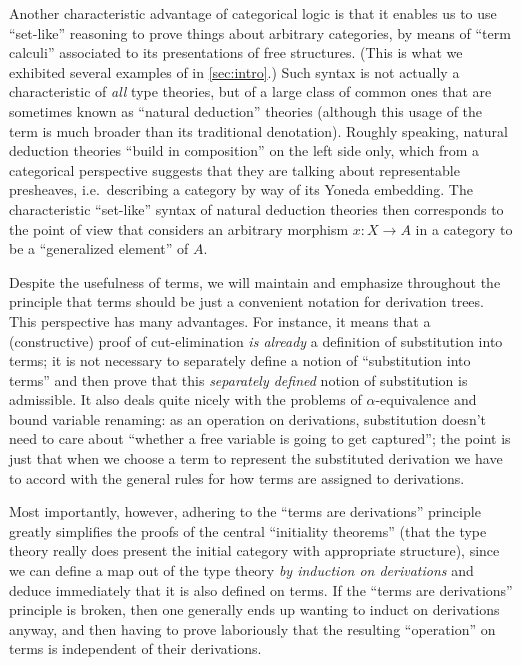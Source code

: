 Another characteristic advantage of categorical logic is that it enables us to use ``set-like'' reasoning to prove things about arbitrary categories, by means of ``term calculi'' associated to its presentations of free structures.
(This is what we exhibited several examples of in \cref{sec:intro}.)
Such syntax is not actually a characteristic of \emph{all} type theories, but of a large class of common ones that are sometimes known as ``natural deduction'' theories (although this usage of the term is much broader than its traditional denotation).
Roughly speaking, natural deduction theories ``build in composition'' on the left side only, which from a categorical perspective suggests that they are talking about representable presheaves, i.e.\ describing a category by way of its Yoneda embedding.
The characteristic ``set-like'' syntax of natural deduction theories then corresponds to the point of view that considers an arbitrary morphism $x:X\to A$ in a category to be a ``generalized element'' of $A$.

Despite the usefulness of terms, we will maintain and emphasize throughout the principle that terms should be just a convenient notation for derivation trees.
This perspective has many advantages.
For instance, it means that a (constructive) proof of cut-elimination \emph{is already} a definition of substitution into terms; it is not necessary to separately define a notion of ``substitution into terms'' and then prove that this \emph{separately defined} notion of substitution is admissible.
It also deals quite nicely with the problems of $\alpha$-equivalence and bound variable renaming: as an operation on derivations, substitution doesn't need to care about ``whether a free variable is going to get captured''; the point is just that when we choose a term to represent the substituted derivation we have to accord with the general rules for how terms are assigned to derivations.

Most importantly, however, adhering to the ``terms are derivations'' principle greatly simplifies the proofs of the central ``initiality theorems'' (that the type theory really does present the initial category with appropriate structure), since we can define a map out of the type theory \emph{by induction on derivations} and deduce immediately that it is also defined on terms.
If the ``terms are derivations'' principle is broken, then one generally ends up wanting to induct on derivations anyway, and then having to prove laboriously that the resulting ``operation'' on terms is independent of their derivations.

